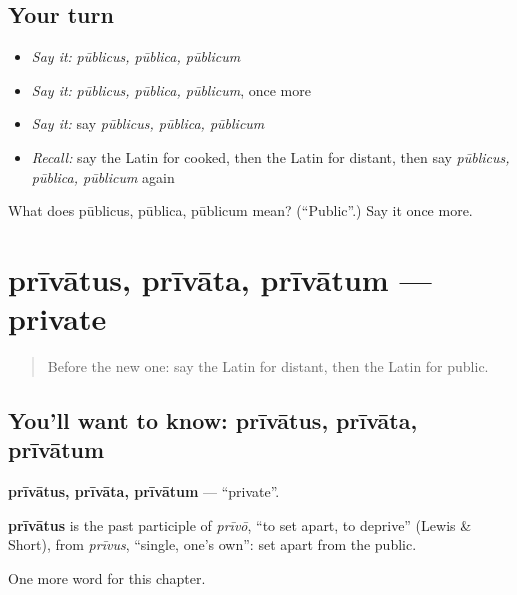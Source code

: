 \subsection*{Your turn}
\begin{itemize}
\raggedright
  \item \emph{Say it:} \emph{pūblicus, pūblica, pūblicum}
  \item \emph{Say it:} \emph{pūblicus, pūblica, pūblicum}, once more
  \item \emph{Say it:} say \emph{pūblicus, pūblica, pūblicum}
  \item \emph{Recall:} say the Latin for cooked, then the Latin for distant, then say \emph{pūblicus, pūblica, pūblicum} again
\end{itemize}

\begin{tcolorbox}[breakable,colback=teal!4,colframe=teal!35!black,title={Before you move on}]
What does pūblicus, pūblica, pūblicum mean? (\textquotedblleft{}Public\textquotedblright{}.) Say it once more.
\end{tcolorbox}
\section[prīvātus, prīvāta, prīvātum]{prīvātus, prīvāta, prīvātum — private}

\label{lesson:LA-C182-privatus}



\begin{quote}
Before the new one: say the Latin for distant, then the Latin for public.
\end{quote}

\subsection*{You'll want to know: prīvātus, prīvāta, prīvātum}
\textbf{prīvātus, prīvāta, prīvātum} — \textquotedblleft{}private\textquotedblright{}.

\begin{cousinweb}
\textbf{prīvātus} is the past participle of \emph{prīvō}, \textquotedblleft{}to set apart, to deprive\textquotedblright{} (Lewis \& Short), from \emph{prīvus}, \textquotedblleft{}single, one's own\textquotedblright{}: set apart from the public.
\end{cousinweb}

\begin{grammarlens}[title={What you've built}]
One more word for this chapter.
\end{grammarlens}

